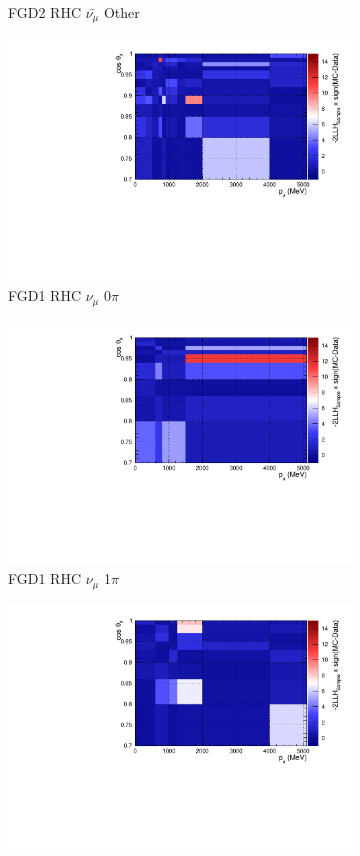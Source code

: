 \begin{figure}
\begin{subfigure}{.32\textwidth}
  \caption{FGD2 RHC $\bar{\nu_{\mu}}$ Other}
  \label{fig:llhcont_FGD2_anti-numuCC_other}
\end{subfigure}
\begin{subfigure}{.32\textwidth}
  \centering
  \includegraphics[width=0.85\linewidth]{figs/llhcont_FGD1_NuMuBkg_CC0pi_in_AntiNu_Mode.pdf}
  \caption{FGD1 RHC $\nu_{\mu}$ 0$\pi$}
  \label{fig:llhcont_FGD1_NuMuBkg_CC0pi_in_AntiNu_Mode}
\end{subfigure}
\begin{subfigure}{.32\textwidth}
  \centering
  \includegraphics[width=0.85\linewidth]{figs/llhcont_FGD1_NuMuBkg_CC1pi_in_AntiNu_Mode.pdf}
  \caption{FGD1 RHC $\nu_{\mu}$ 1$\pi$}
  \label{fig:llhcont_FGD1_NuMuBkg_CC1pi_in_AntiNu_Mode}
\end{subfigure}
\begin{subfigure}{.32\textwidth}
  \centering
  \includegraphics[width=0.85\linewidth]{figs/llhcont_FGD1_NuMuBkg_CCOther_in_AntiNu_Mode.pdf}

\end{subfigure}
\end{figure}
